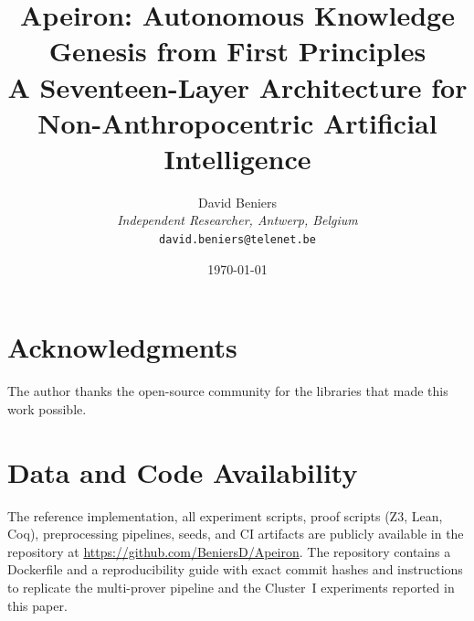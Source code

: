 \documentclass[11pt,twoside]{article}
\title{\huge \textbf{Apeiron: Autonomous Knowledge Genesis from First Principles} \\
\large A Seventeen-Layer Architecture for Non-Anthropocentric Artificial Intelligence}
\author{
    David Beniers \\
    \small \textit{Independent Researcher, Antwerp, Belgium} \\
    \small \texttt{david.beniers@telenet.be}
}
\date{\today}
\let\oldsection\section
\renewcommand{\section}{\clearpage\oldsection}
\theoremstyle{plain}
\theoremstyle{definition}
\begin{document}
\maketitle

\begin{abstract}

\end{abstract}


\tableofcontents
\newpage





















\section*{Acknowledgments}
The author thanks the open-source community for the libraries that made this work possible.

\appendix





\section{Data and Code Availability}
\label{sec:availability}

The reference implementation, all experiment scripts, proof scripts (Z3, Lean, Coq), preprocessing pipelines, seeds, and CI artifacts are publicly available in the repository at \url{https://github.com/BeniersD/Apeiron}. The repository contains a Dockerfile and a reproducibility guide with exact commit hashes and instructions to replicate the multi-prover pipeline and the Cluster~I experiments reported in this paper.

\printbibliography
\listoffigures
\end{document}
